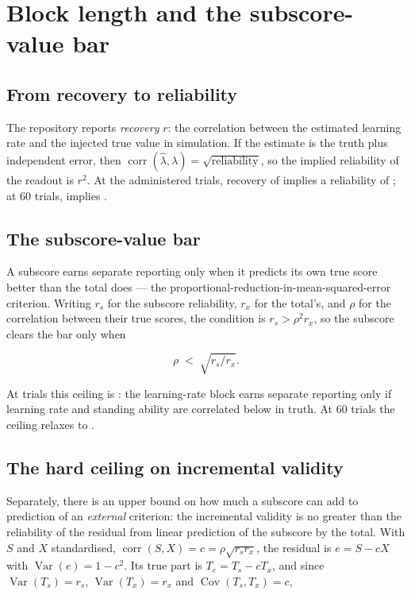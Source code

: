 \section{Block length and the subscore-value bar}
\label{app:block}

\subsection{From recovery to reliability}

The repository reports \emph{recovery} $r$: the correlation between the
estimated learning rate and the injected true value in simulation. If the
estimate is the truth plus independent error, then
$\operatorname{corr}(\hat\lambda,\lambda)=\sqrt{\text{reliability}}$, so the
implied reliability of the readout is $r^{2}$. At the administered
\BlockAdministered{} trials, recovery of \RecoveryThirty{} implies a reliability
of \RelLRthirty{}; at 60 trials, \RecoverySixty{} implies \RelLRsixty{}.

\subsection{The subscore-value bar}

A subscore earns separate reporting only when it predicts its own true score
better than the total does --- the proportional-reduction-in-mean-squared-error
criterion. Writing $r_s$ for the subscore reliability, $r_x$ for the total's,
and $\rho$ for the correlation between their true scores, the condition is
$r_s > \rho^{2}r_x$, so the subscore clears the bar only when

\[
\rho \;<\; \sqrt{r_s/r_x}.
\]

At \BlockAdministered{} trials this ceiling is \HabermanThirty{}: the
learning-rate block earns separate reporting only if learning rate and standing
ability are correlated below \HabermanThirty{} in truth. At 60 trials the
ceiling relaxes to \HabermanSixty{}.

\subsection{The hard ceiling on incremental validity}

Separately, there is an upper bound on how much a subscore can add to prediction
of an \emph{external} criterion: the incremental validity is no greater than the
reliability of the residual from linear prediction of the subscore by the total.
With $S$ and $X$ standardised, $\operatorname{corr}(S,X)=c=\rho\sqrt{r_sr_x}$,
the residual is $e=S-cX$ with $\operatorname{Var}(e)=1-c^{2}$. Its true part is
$T_e=T_s-cT_x$, and since $\operatorname{Var}(T_s)=r_s$,
$\operatorname{Var}(T_x)=r_x$ and $\operatorname{Cov}(T_s,T_x)=c$,

